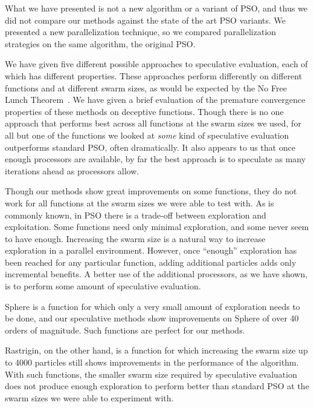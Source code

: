 \documentclass[smallcondensed]{svjour3}
\begin{document}
What we have presented is not a new algorithm or a variant of PSO, and thus we
did not compare our methods against the state of the art PSO variants.  We
presented a new parallelization technique, so we compared parallelization
strategies on the same algorithm, the original PSO.

We have given five different possible approaches to speculative evaluation,
each of which has different properties.  These approaches perform differently
on different functions and at different swarm sizes, as would be expected by
the No Free Lunch Theorem~\citep{wolpert-1997-nfl-for-optimization}.  We have
given a brief evaluation of the premature convergence properties of these
methods on deceptive functions.  Though there is no one approach that performs
best across all functions at the swarm sizes we used, for all but one of the
functions we looked at \emph{some} kind of speculative evaluation outperforms
standard PSO, often dramatically.  It also appears to us that once enough
processors are available, by far the best approach is to speculate as many
iterations ahead as processors allow.

Though our methods show great improvements on some functions, they do not work
for all functions at the swarm sizes we were able to test with.  As is commonly
known, in PSO there is a trade-off between exploration and exploitation.  Some
functions need only minimal exploration, and some never seem to have enough.
Increasing the swarm size is a natural way to increase exploration in a
parallel environment.  However, once ``enough'' exploration has been reached
for any particular function, adding additional particles adds only incremental
benefits.  A better use of the additional processors, as we have shown, is to
perform some amount of speculative evaluation.

Sphere is a function for which only a very small amount of exploration needs to
be done, and our speculative methods show improvements on Sphere of over 40
orders of magnitude.  Such functions are perfect for our methods.

Rastrigin, on the other hand, is a function for which increasing the swarm size
up to 4000 particles still shows improvements in the performance of the
algorithm.  With such functions, the smaller swarm size required by speculative
evaluation does not produce enough exploration to perform better than standard
PSO at the swarm sizes we were able to experiment with.
\end{document}
